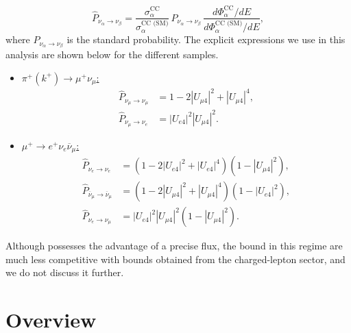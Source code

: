 %
\begin{equation}
 \hat{P}_{\nu_{\alpha} \to \nu_{\beta}} = \frac{\sigma^{\text{CC}}_{\alpha}}{\sigma^{\text{CC (SM)}}_{\alpha}} \, P_{\nu_{\alpha} \to \nu_{\beta}} \, \frac{d\Phi^{\text{CC}}_{\alpha}/dE}{d\Phi^{\text{CC (SM)}}_{\alpha}/dE},
\end{equation}
where $P_{\nu_{\alpha} \to \nu_{\beta}}$ is the standard probability. The explicit expressions we use in this analysis are shown below for the different samples.
\begin{itemize}
 \item \underline{$\pi^+ (k^+) \to \mu^+ \nu_{\mu}$:}
      \begin{align}
	\hat{P}_{\nu_{\mu} \to \nu_{\mu}} &= 1 - 2 |U_{\mu 4}|^2 + |U_{\mu 4}|^4, \\
	\hat{P}_{\nu_{\mu} \to \nu_{e}} &= |U_{e 4}|^2|U_{\mu 4}|^2.
      \end{align}
 \item \underline{$\mu^+ \to e^+ \nu_{e} \overline{\nu}_{\mu}$:}
      \begin{align}
	\hat{P}_{\nu_{e} \to \nu_{e}} &= \left(1 - 2 |U_{e 4}|^2 + |U_{e 4}|^4\right) \left( 1 - |U_{\mu4}|^2\right), \\	
	\hat{P}_{\overline{\nu}_{\mu} \to \overline{\nu}_{\mu}} &= \left(1 - 2 |U_{\mu 4}|^2 + |U_{\mu 4}|^4\right) \left( 1 - |U_{e4}|^2\right), \\
	\hat{P}_{\nu_{e} \to \nu_{\mu}} &= |U_{e 4}|^2|U_{\mu 4}|^2\left( 1 - |U_{\mu4}|^2\right).
      \end{align}
\end{itemize}
%
Although \nus possesses the advantage of a precise flux, the bound in this regime are much less competitive with bounds obtained from the charged-lepton sector, and we do not discuss it further. 

\section{Overview}


